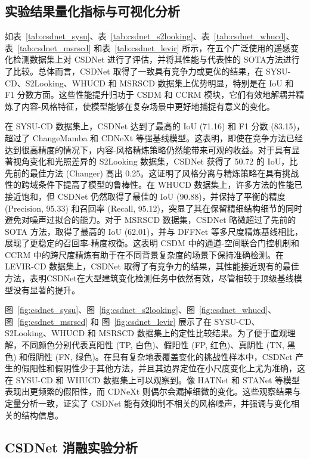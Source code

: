 \subsection{实验结果量化指标与可视化分析}

如表~\ref{tab:csdnet_sysu}、表~\ref{tab:csdnet_s2looking}、表~\ref{tab:csdnet_whucd}、表~\ref{tab:csdnet_msrscd} 和表~\ref{tab:csdnet_levir} 所示，在五个广泛使用的遥感变化检测数据集上对 CSDNet 进行了评估，并将其性能与代表性的 SOTA方法进行了比较。总体而言，CSDNet 取得了一致具有竞争力或更优的结果，在 SYSU-CD、S2Looking、WHUCD 和 MSRSCD 数据集上优势明显，特别是在 IoU 和 F1 分数方面。这些性能提升归功于 CSDM 和 CCRM 模块，它们有效地解耦并精炼了内容-风格特征，使模型能够在复杂场景中更好地捕捉有意义的变化。

在 SYSU-CD 数据集上，CSDNet 达到了最高的 IoU (71.16) 和 F1 分数 (83.15)，超过了 ChangeMamba 和 CDNeXt 等强基线模型。这表明，即使在竞争方法已经达到很高精度的情况下，内容-风格精炼策略仍然能带来可观的收益。对于具有显著视角变化和光照差异的 S2Looking 数据集，CSDNet 获得了 50.72 的 IoU，比先前的最佳方法 (Changer) 高出 0.25。这证明了风格分离与精炼策略在具有挑战性的跨域条件下提高了模型的鲁棒性。在 WHUCD 数据集上，许多方法的性能已接近饱和，但 CSDNet 仍然取得了最佳的 IoU (90.88)，并保持了平衡的精度 (Precision, 95.33) 和召回率 (Recall, 95.12)，突显了其在保留精细结构细节的同时避免对噪声过拟合的能力。对于 MSRSCD 数据集，CSDNet 略微超过了先前的 SOTA 方法，取得了最高的 IoU (62.01)，并与 DFFNet 等多尺度精炼基线相比，展现了更稳定的召回率-精度权衡。这表明 CSDM 中的通道-空间联合门控机制和 CCRM 中的跨尺度精炼有助于在不同背景复杂度的场景下保持准确检测。在 LEVIR-CD 数据集上，CSDNet 取得了有竞争力的结果，其性能接近现有的最佳方法，表明CSDNet在大型建筑变化检测任务中依然有效，尽管相较于顶级基线模型没有显著的提升。

图~\ref{fig:csdnet_sysu}、图~\ref{fig:csdnet_s2looking}、图~\ref{fig:csdnet_whucd}、图~\ref{fig:csdnet_msrscd} 和 图~\ref{fig:csdnet_levir} 展示了在 SYSU-CD、S2Looking、WHUCD 和 MSRSCD 数据集上的定性比较结果。为了便于直观理解，不同颜色分别代表真阳性 (TP, 白色)、假阳性 (FP, 红色)、真阴性 (TN, 黑色) 和假阴性 (FN, 绿色)。在具有复杂地表覆盖变化的挑战性样本中，CSDNet 产生的假阳性和假阴性少于其他方法，并且其边界定位在小尺度变化上尤为准确，这在 SYSU-CD 和 WHUCD 数据集上可以观察到。像 HATNet 和 STANet 等模型表现出更频繁的假阳性，而 CDNeXt 则偶尔会漏掉细微的变化。这些观察结果与定量分析一致，证实了 CSDNet 能有效抑制不相关的风格噪声，并强调与变化相关的结构信息。


\subsection{CSDNet 消融实验分析}

